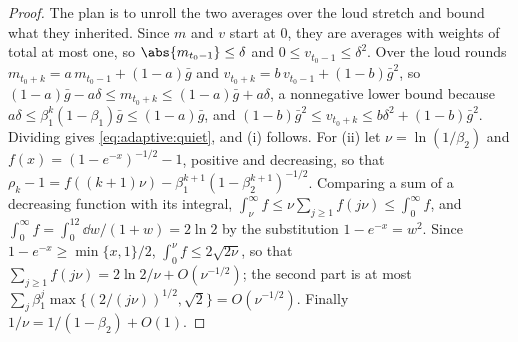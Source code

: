 \begin{refsection}

\begin{proof}
The plan is to unroll the two averages over the loud stretch and bound what they inherited. Since $m$ and $v$ start at $0$, they are averages with weights of total at most one, so $\abs{m_{t_0-1}}\le\delta$ and $0\le v_{t_0-1}\le\delta^2$. Over the loud rounds $m_{t_0+k}=a\,m_{t_0-1}+(1-a)\bar g$ and $v_{t_0+k}=b\,v_{t_0-1}+(1-b)\bar g^2$, so $(1-a)\bar g-a\delta\le m_{t_0+k}\le(1-a)\bar g+a\delta$, a nonnegative lower bound because $a\delta\le\beta_1^k(1-\beta_1)\bar g\le(1-a)\bar g$, and $(1-b)\bar g^2\le v_{t_0+k}\le b\delta^2+(1-b)\bar g^2$. Dividing gives \eqref{eq:adaptive:quiet}, and (i) follows. For (ii) let $\nu=\ln(1/\beta_2)$ and $f(x)=(1-e^{-x})^{-1/2}-1$, positive and decreasing, so that \mbox{$\rho_k-1=f((k+1)\nu)-\beta_1^{k+1}(1-\beta_2^{k+1})^{-1/2}$}. Comparing a sum of a decreasing function with its integral, $\int_\nu^\infty f\le\nu\sum_{j\ge1}f(j\nu)\le\int_0^\infty f$, and $\int_0^\infty f=\int_0^12\dd w/(1+w)=2\ln2$ by the substitution $1-e^{-x}=w^2$. Since $1-e^{-x}\ge\min\{x,1\}/2$, $\int_0^\nu f\le2\sqrt{2\nu}$, so that $\sum_{j\ge1}f(j\nu)=2\ln2/\nu+O(\nu^{-1/2})$; the second part is at most $\sum_j\beta_1^j\max\{(2/(j\nu))^{1/2},\sqrt2\}=O(\nu^{-1/2})$. Finally $1/\nu=1/(1-\beta_2)+O(1)$.
\end{proof}


\end{refsection}
